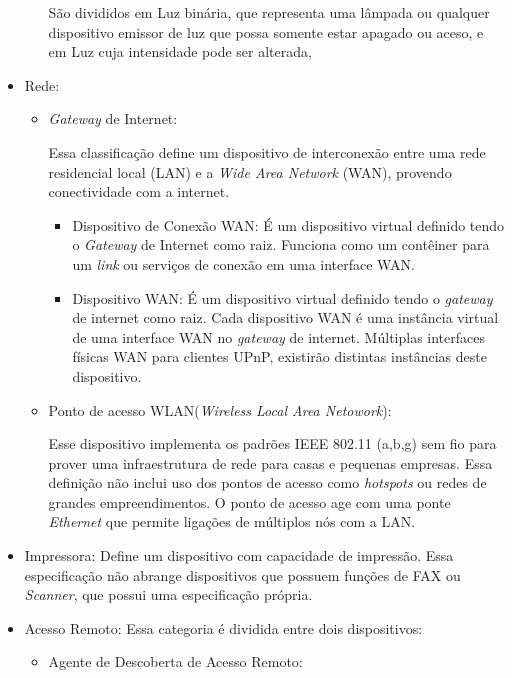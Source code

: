 \begin{itemize}
\begin{itemize}
			São divididos em Luz binária, que representa uma lâmpada ou qualquer dispositivo emissor de luz que possa somente estar apagado ou aceso, e em Luz cuja intensidade pode ser alterada, 
	\end{itemize}

\item Rede:
	\begin{itemize}
		\item \emph{Gateway} de Internet:
			
			Essa classificação define um dispositivo de interconexão entre uma rede residencial local (LAN) e a \emph{Wide Area Network} (WAN), provendo conectividade com a internet.
			\begin{itemize}
				\item Dispositivo de Conexão WAN: É um dispositivo virtual definido tendo o \emph{Gateway} de Internet como raiz. Funciona como um contêiner para um \emph{link} ou serviços de conexão em uma interface WAN. 
				\item Dispositivo WAN: É um dispositivo virtual definido tendo o \emph{gateway} de internet como raiz. Cada dispositivo WAN é uma instância virtual de uma interface WAN no \emph{gateway} de internet. Múltiplas interfaces físicas WAN para clientes UPnP, existirão distintas instâncias deste dispositivo.
			\end{itemize}

		\item Ponto de acesso WLAN(\emph{Wireless Local Area Netowork}):
			
			Esse dispositivo implementa os padrões IEEE 802.11 (a,b,g) sem fio para prover uma infraestrutura de rede para casas e pequenas empresas. Essa definição não inclui uso dos pontos de acesso como \emph{hotspots} ou redes de grandes empreendimentos. O ponto de acesso age com uma ponte \emph{Ethernet} que permite ligações de múltiplos nós com a LAN.
	\end{itemize}

\item Impressora:
	Define um dispositivo com capacidade de impressão. Essa especificação não abrange dispositivos que possuem funções de FAX ou \emph{Scanner}, que possui uma especificação própria.

\item Acesso Remoto:
	Essa categoria é dividida entre dois dispositivos:
	\begin{itemize}
		\item Agente de Descoberta de Acesso Remoto:


\end{itemize}
\end{itemize}
